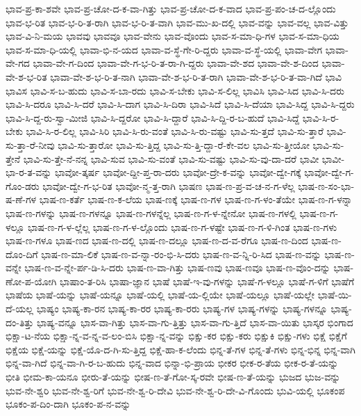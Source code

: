 {ಭಾವ-ಪ್ರ-ಕಾ-ಶವೇ
ಭಾವ-ಪ್ರ-ಚೋ-ದ-ಕ-ವಾ-ಗಿತ್ತು
ಭಾವ-ಪ್ರ-ಚೋ-ದ-ಕ-ವಾದ
ಭಾವ-ಪ್ರ-ಪಂ-ಚ-ದ-ಲ್ಲೊಂದು
ಭಾವ-ಭ-ರಿತ
ಭಾವ-ಭ-ರಿ-ತ-ರಾಗಿ
ಭಾವ-ಭ-ರಿ-ತ-ವಾಗಿ
ಭಾವ-ಮು-ಖ-ದಲ್ಲಿ
ಭಾವ-ವನ್ನು
ಭಾವ-ವಲ್ಲ
ಭಾವ-ವಿತ್ತು
ಭಾವ-ವಿ-ನಿ-ಮಯ
ಭಾವವು
ಭಾವವೂ
ಭಾವ-ವೇನು
ಭಾವ-ವೊಂದು
ಭಾವ-ಸ-ಮಾ-ಧಿ-ಗಳ
ಭಾವ-ಸ-ಮಾ-ಧಿಯ
ಭಾವ-ಸ-ಮಾ-ಧಿ-ಯಲ್ಲಿ
ಭಾವಾ-ಭಿ-ನ-ಯದ
ಭಾವಾ-ವ-ಸ್ಥೆ-ಗೇ-ರಿ-ದ್ದರು
ಭಾವಾ-ವ-ಸ್ಥೆ-ಯಲ್ಲಿ
ಭಾವಾ-ವೇಗ
ಭಾವಾ-ವೇ-ಗದ
ಭಾವಾ-ವೇ-ಗ-ದಿಂದ
ಭಾವಾ-ವೇ-ಗ-ಭ-ರಿ-ತ-ರಾ-ಗಿ-ದ್ದರು
ಭಾವಾ-ವೇ-ಶದ
ಭಾವಾ-ವೇ-ಶ-ದಿಂದ
ಭಾವಾ-ವೇ-ಶ-ಭ-ರಿತ
ಭಾವಾ-ವೇ-ಶ-ಭ-ರಿ-ತ-ನಾಗಿ
ಭಾವಾ-ವೇ-ಶ-ಭ-ರಿ-ತ-ರಾಗಿ
ಭಾವಾ-ವೇ-ಶ-ಭ-ರಿ-ತ-ವಾ-ಗಿದೆ
ಭಾವಿ
ಭಾವಿಸ
ಭಾವಿ-ಸ-ಬ-ಹುದು
ಭಾವಿ-ಸ-ಬಾ-ರದು
ಭಾವಿ-ಸ-ಬೇಕು
ಭಾವಿ-ಸ-ಲಿಲ್ಲ
ಭಾವಿಸಿ
ಭಾವಿ-ಸಿದ
ಭಾವಿ-ಸಿ-ದರು
ಭಾವಿ-ಸಿ-ದರೂ
ಭಾವಿ-ಸಿ-ದರೆ
ಭಾವಿ-ಸಿ-ದಾಗ
ಭಾವಿ-ಸಿ-ದಿರಾ
ಭಾವಿ-ಸಿದೆ
ಭಾವಿ-ಸಿ-ದೆಯಾ
ಭಾವಿ-ಸಿದ್ದ
ಭಾವಿ-ಸಿ-ದ್ದರು
ಭಾವಿ-ಸಿ-ದ್ದ-ರು-ಸ್ವಾ-ಮೀಜಿ
ಭಾವಿ-ಸಿ-ದ್ದರೋ
ಭಾವಿ-ಸಿ-ದ್ದಾರೆ
ಭಾವಿ-ಸಿ-ದ್ದಿ-ರ-ಬ-ಹುದೆ
ಭಾವಿ-ಸಿದ್ದೆ
ಭಾವಿ-ಸಿ-ರ-ಬೇಕು
ಭಾವಿ-ಸಿ-ರ-ಲಿಲ್ಲ
ಭಾವಿ-ಸಿರಿ
ಭಾವಿ-ಸಿ-ರು-ವಂತೆ
ಭಾವಿ-ಸಿ-ರು-ವಷ್ಟು
ಭಾವಿ-ಸು-ತ್ತದೆ
ಭಾವಿ-ಸು-ತ್ತಾರೆ
ಭಾವಿ-ಸು-ತ್ತಾ-ರೆ-ನೀವು
ಭಾವಿ-ಸು-ತ್ತಾರೋ
ಭಾವಿ-ಸು-ತ್ತಿದ್ದ
ಭಾವಿ-ಸು-ತ್ತಿ-ದ್ದಾ-ರೆ-ಕೇ-ವಲ
ಭಾವಿ-ಸು-ತ್ತೀಯೋ
ಭಾವಿ-ಸು-ತ್ತೇನೆ
ಭಾವಿ-ಸು-ತ್ತೇ-ನೆ-ನನ್ನ
ಭಾವಿ-ಸುವ
ಭಾವಿ-ಸು-ವಂತೆ
ಭಾವಿ-ಸು-ವಷ್ಟು
ಭಾವಿ-ಸು-ವು-ದಾ-ದರೆ
ಭಾವೀ
ಭಾವೀ-ಭಾ-ರ-ತ-ವನ್ನು
ಭಾವೋ-ತ್ಕರ್ಷ
ಭಾವೋ-ದ್ದೀ-ಪ್ತ-ರಾ-ದರು
ಭಾವೋ-ದ್ರೇ-ಕ-ವನ್ನು
ಭಾವೋ-ದ್ವೇ-ಗಕ್ಕೆ
ಭಾವೋ-ದ್ವೇ-ಗ-ಗೊಂ-ಡರು
ಭಾವೋ-ದ್ವೇ-ಗ-ಭ-ರಿತ
ಭಾವೋ-ನ್ಮ-ತ್ತ-ರಾಗಿ
ಭಾಷಣ
ಭಾಷ-ಣ-ಪ್ರ-ವ-ಚ-ನ-ಗ-ಳೆಲ್ಲ
ಭಾಷ-ಣ-ಸಂ-ಭಾ-ಷ-ಣೆ-ಗಳ
ಭಾಷ-ಣ-ಕರ್ತೆ
ಭಾಷ-ಣ-ಕ-ಲೆಯ
ಭಾಷ-ಣಕ್ಕೆ
ಭಾಷ-ಣ-ಗಳ
ಭಾಷ-ಣ-ಗ-ಳಂ-ತೆಯೇ
ಭಾಷ-ಣ-ಗ-ಳನ್ನಾ
ಭಾಷ-ಣ-ಗಳನ್ನು
ಭಾಷ-ಣ-ಗಳನ್ನೂ
ಭಾಷ-ಣ-ಗಳನ್ನೆಲ್ಲ
ಭಾಷ-ಣ-ಗ-ಳ-ನ್ನೇನೋ
ಭಾಷ-ಣ-ಗಳಲ್ಲಿ
ಭಾಷ-ಣ-ಗ-ಳಲ್ಲೂ
ಭಾಷ-ಣ-ಗ-ಳ-ಲ್ಲೆಲ್ಲ
ಭಾಷ-ಣ-ಗ-ಳ-ಲ್ಲೊಂದು
ಭಾಷ-ಣ-ಗ-ಳಷ್ಟೇ
ಭಾಷ-ಣ-ಗ-ಳಿ-ಗಿಂತ
ಭಾಷ-ಣ-ಗಳು
ಭಾಷ-ಣ-ಗಳೂ
ಭಾಷ-ಣದ
ಭಾಷ-ಣ-ದಲ್ಲಿ
ಭಾಷ-ಣ-ದಲ್ಲೂ
ಭಾಷ-ಣ-ದ-ವ-ರೆಗೂ
ಭಾಷ-ಣ-ದಿಂದ
ಭಾಷ-ಣ-ದೊಂ-ದಿಗೆ
ಭಾಷ-ಣ-ಮಾ-ಲಿಕೆ
ಭಾಷ-ಣ-ವ-ನ್ನಾ-ರಂ-ಭಿ-ಸಿ-ದರು
ಭಾಷ-ಣ-ವ-ನ್ನಿ-ರಿ-ಸಿದ
ಭಾಷ-ಣ-ವನ್ನು
ಭಾಷ-ಣ-ವನ್ನೇ
ಭಾಷ-ಣ-ವ-ನ್ನೇ-ರ್ಪ-ಡಿ-ಸಿ-ದರು
ಭಾಷ-ಣ-ವಾ-ಗಿತ್ತು
ಭಾಷ-ಣವು
ಭಾಷ-ಣವೂ
ಭಾಷ-ಣ-ವೊಂ-ದನ್ನು
ಭಾಷ-ಣೋ-ಪ-ಯೋಗಿ
ಭಾಷಾಂ-ತ-ರಿಸಿ
ಭಾಷಾ-ಜ್ಞಾನ
ಭಾಷೆ
ಭಾಷೆ-ಇ-ವು-ಗಳನ್ನು
ಭಾಷೆ-ಗ-ಳಲ್ಲೂ
ಭಾಷೆ-ಗ-ಳಿಗೆ
ಭಾಷೆಗೆ
ಭಾಷೆಯ
ಭಾಷೆ-ಯನ್ನು
ಭಾಷೆ-ಯನ್ನೂ
ಭಾಷೆ-ಯಲ್ಲಿ
ಭಾಷೆ-ಯ-ಲ್ಲಿಯೇ
ಭಾಷೆ-ಯಲ್ಲೂ
ಭಾಷೆ-ಯಲ್ಲೇ
ಭಾಷೆ-ಯಿ-ದೆ-ಯಲ್ಲ
ಭಾಷ್ಯಂ
ಭಾಷ್ಯ-ಕಾ-ರನ
ಭಾಷ್ಯ-ಕಾ-ರರ
ಭಾಷ್ಯ-ಕಾ-ರರು
ಭಾಷ್ಯ-ಗಳ
ಭಾಷ್ಯ-ಗಳನ್ನು
ಭಾಷ್ಯ-ಗಳನ್ನೂ
ಭಾಷ್ಯ-ದಂ-ತಿತ್ತು
ಭಾಷ್ಯ-ವನ್ನೂ
ಭಾಸ-ವಾ-ಗಿತ್ತು
ಭಾಸ-ವಾ-ಗು-ತ್ತಿತ್ತು
ಭಾಸ-ವಾ-ಗು-ತ್ತಿದೆ
ಭಾಸ-ವಾ-ಯಿತು
ಭಾಸ್ಕರ
ಭಿಂಗಾದ
ಭಿಕ್ಷಾ-ಟ-ನೆಯ
ಭಿಕ್ಷಾ-ನ್ನ-ವ-ನ್ನ-ವ-ಲಂ-ಬಿಸಿ
ಭಿಕ್ಷಾ-ನ್ನ-ವನ್ನು
ಭಿಕ್ಷು-ಕರ
ಭಿಕ್ಷು-ಕರು
ಭಿಕ್ಷುಕಿ
ಭಿಕ್ಷು-ಗಳು
ಭಿಕ್ಷೆ
ಭಿಕ್ಷೆಗೆ
ಭಿಕ್ಷೆಯ
ಭಿಕ್ಷೆ-ಯನ್ನು
ಭಿಕ್ಷೆ-ಯೊ-ದ-ಗಿ-ಸು-ತ್ತಿದ್ದ
ಭಿಕ್ಷೆ-ಹಾ-ಕ-ಲೆಂದು
ಭಿನ್ನ-ತೆ-ಗಳ
ಭಿನ್ನ-ತೆ-ಗಳು
ಭಿನ್ನ-ಭಿನ್ನ
ಭಿನ್ನ-ವಾಗಿ
ಭಿನ್ನ-ವಾ-ಗಿದೆ
ಭಿನ್ನ-ವಾ-ಗಿ-ರ-ಬ-ಹುದು
ಭಿನ್ನ-ವಾದ
ಭಿನ್ನಾ-ಭಿ-ಪ್ರಾಯ
ಭೀಕರ
ಭೀಕ-ರ-ತೆಯ
ಭೀಕ-ರ-ತೆ-ಯನ್ನು
ಭೀತಿ
ಭೀಮ-ಕಾ-ಯನೂ
ಭೀರು-ತೆ-ಯನ್ನು
ಭೀಷ-ಣ-ತೆ-ಗೋ-ಸ್ಕ-ರವೇ
ಭೀಷ-ಣ-ತೆ-ಯನ್ನು
ಭುಜದ
ಭುಜ-ವನ್ನು
ಭುವ-ನೇ-ಶ್ವರಿ
ಭುವ-ನೇ-ಶ್ವ-ರಿಗೆ
ಭುವ-ನೇ-ಶ್ವ-ರಿ-ದೇವಿ
ಭುವ-ನೇ-ಶ್ವ-ರಿ-ದೇ-ವಿ-ಗೊಂದು
ಭುವಿ-ಯಲ್ಲಿ
ಭೂಕಂಪ
ಭೂಕಂ-ಪ-ದಿಂ-ದಾಗಿ
ಭೂಕಂ-ಪ-ನ-ವನ್ನು
}

